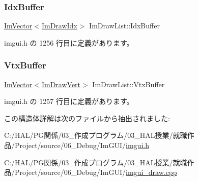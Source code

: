 \subsubsection{\texorpdfstring{Idx\+Buffer}{IdxBuffer}}
{\footnotesize\ttfamily \mbox{\hyperlink{class_im_vector}{Im\+Vector}}$<$\mbox{\hyperlink{imgui_8h_afdc8744a5ac1a968b1ddfa47e13b2fa1}{Im\+Draw\+Idx}}$>$ Im\+Draw\+List\+::\+Idx\+Buffer}



 imgui.\+h の 1256 行目に定義があります。

\mbox{\label{struct_im_draw_list_aa8ff4aee39cf3c3791b7e29a7b4264be}} 
\subsubsection{\texorpdfstring{Vtx\+Buffer}{VtxBuffer}}
{\footnotesize\ttfamily \mbox{\hyperlink{class_im_vector}{Im\+Vector}}$<$\mbox{\hyperlink{struct_im_draw_vert}{Im\+Draw\+Vert}}$>$ Im\+Draw\+List\+::\+Vtx\+Buffer}



 imgui.\+h の 1257 行目に定義があります。



この構造体詳解は次のファイルから抽出されました\+:\begin{DoxyCompactItemize}
\item 
C\+:/\+H\+A\+L/\+P\+G関係/03\+\_\+作成プログラム/03\+\_\+\+H\+A\+L授業/就職作品/\+Project/source/06\+\_\+\+Debug/\+Im\+G\+U\+I/\mbox{\hyperlink{imgui_8h}{imgui.\+h}}\item 
C\+:/\+H\+A\+L/\+P\+G関係/03\+\_\+作成プログラム/03\+\_\+\+H\+A\+L授業/就職作品/\+Project/source/06\+\_\+\+Debug/\+Im\+G\+U\+I/\mbox{\hyperlink{imgui__draw_8cpp}{imgui\+\_\+draw.\+cpp}}\end{DoxyCompactItemize}
